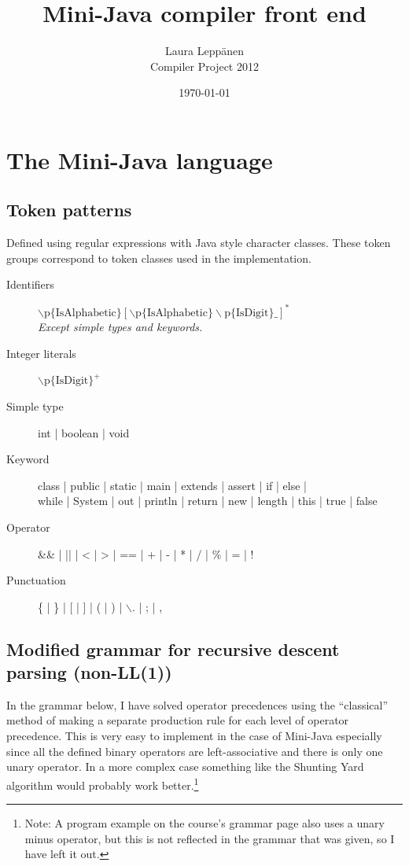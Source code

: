 \documentclass[a4paper,11pt]{article}
\begin{document}
\title{Mini-Java compiler front end}
\author{Laura Leppänen \\ Compiler Project 2012}
\date{\today}
\maketitle
\thispagestyle{empty}

\tableofcontents
\onehalfspacing

\newpage
\setcounter{page}{1}

\section{The Mini-Java language}

\subsection{Token patterns}

Defined using regular expressions with Java style character classes. These token groups correspond to token classes used in the implementation.

\begin{description}
\item[Identifiers] $\backslash\text{p\{IsAlphabetic\}} [ \backslash\text{p\{IsAlphabetic\}}\backslash\text{p\{IsDigit\}\_ } ]^{*}$ \\ \emph{Except simple types and keywords.}
\item[Integer literals] $\backslash\text{p\{IsDigit\}}^{+}$
\item[Simple type] int | boolean | void
\item[Keyword] class | public | static | main | extends | assert | if | else | \\ while | System | out | println | return | new | length | this | true | false
\item[Operator] \&\& | || | < | > | == | + | - | *  | / | \% | = | !
\item[Punctuation] \{ | \} | [ | ] | ( | ) | $\backslash$. | ; | ,
\end{description}

\subsection{Modified grammar for recursive descent parsing (non-LL(1))}

In the grammar below, I have solved operator precedences using the ``classical'' method of making a separate production rule for each level of operator precedence. This is very easy to implement in the case of Mini-Java especially since all the defined binary operators are left-associative and there is only one unary operator. In a more complex case something like the Shunting Yard algorithm would probably work better.\footnote{Note: A program example on the course's grammar page also uses a unary minus operator, but this is not reflected in the grammar that was given, so I have left it out.}
\end{document}
